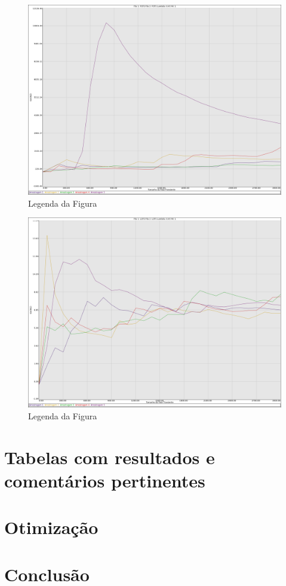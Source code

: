 \documentclass[a4paper,10pt]{article}
\begin{document}
\begin{figure}
	\caption{Legenda da Figura}
	\label{figTransiente3kfila2VarW}
	\includegraphics[scale = 0.2]{./graficos_transiente_2/03.png}
\end{figure}

\begin{figure}
	\caption{Legenda da Figura}
	\label{figTransiente3kfila1VarW}
	\includegraphics[scale = 0.2]{./graficos_transiente_2/04.png}
\end{figure}

\clearpage
\pagebreak

\section{Tabelas com resultados e comentários pertinentes}
\pagebreak

\section{Otimização}
\pagebreak

\section{Conclusão}
\pagebreak
\end{document}
